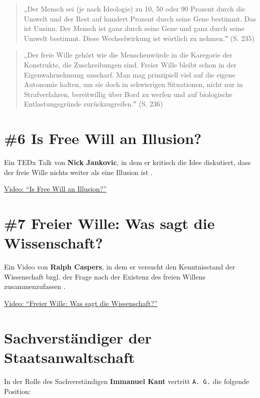 \documentclass[
  a4paper,
]{report}
\begin{document}
\begin{quote}
„Der Mensch sei (je nach Ideologie) zu 10, 50 oder 90 Prozent durch die Umwelt und der Rest auf hundert Prozent durch seine Gene bestimmt. Das ist Unsinn. Der Mensch ist ganz durch seine Gene und ganz durch seine Umwelt bestimmt. Diese Wechselwirkung ist wörtlich zu nehmen.‟ (S. 235)
\end{quote}

\begin{quote}
„Der freie Wille gehört wie die Menschenwürde in die Karegorie der Konstrukte, die Zuschreibungen sind. Freier Wille bleibt schon in der Eigenwahrnehmung unscharf. Man mag prinzipiell viel auf die eigene Autonomie halten, um sie doch in schwierigen Situationen, nicht nur in Strafverfahren, bereitwillig über Bord zu werfen und auf biologische Entlastungsgründe zurückzugreifen.‟ (S. 236)
\end{quote}

\hypertarget{pr-ev6}{%
\section{\#6 Is Free Will an Illusion?}\label{pr-ev6}}

Ein TEDx Talk von \textbf{Nick Jankovic}, in dem er kritisch die Idee diskutiert, dass der freie Wille nichts weiter als eine Illusion ist \citep{Jankovic2021}.

\href{https://www.youtube.com/watch?v=J21bSGGvnD4}{Video: ``Is Free Will an Illusion?''}

\hypertarget{pr-ev7}{%
\section{\#7 Freier Wille: Was sagt die Wissenschaft?}\label{pr-ev7}}

Ein Video von \textbf{Ralph Caspers}, in dem er versucht den Kenntnisstand der Wissenschaft bzgl. der Frage nach der Existenz des freien Willens zusammenzufassen \citep{Caspers2021}.

\href{https://www.youtube.com/watch?v=45Iut50Cm_Q}{Video: ``Freier Wille: Was sagt die Wissenschaft?''}

\hypertarget{pr-expert}{%
\section{Sachverständiger der Staatsanwaltschaft}\label{pr-expert}}

In der Rolle des Sachverständigen \textbf{Immanuel Kant} vertritt \texttt{A.\ G.} die folgende Position:
\end{document}
